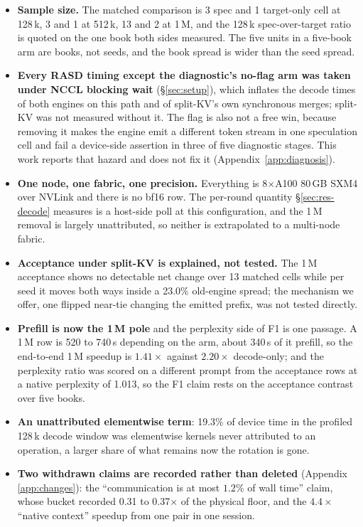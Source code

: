 \documentclass{article}
\begin{document}
\begin{itemize}[leftmargin=*,topsep=2pt,itemsep=1pt]
  \item \textbf{Sample size.} The matched comparison is 3 spec and 1 target-only cell at
        128\,k, 3 and 1 at 512\,k, 13 and 2 at 1\,M, and the 128\,k spec-over-target ratio is
        quoted on the one book both sides measured. The five units in a five-book arm are
        books, not seeds, and the book spread is wider than the seed spread.
  \item \textbf{Every RASD timing except the diagnostic's no-flag arm was taken under NCCL
        blocking wait} (\S\ref{sec:setup}), which
        inflates the decode times of both engines on this path and of split-KV's own
        synchronous merges; split-KV was not measured without it. The flag is also not a free
        win, because removing it makes the engine emit a different token stream in one
        speculation cell and fail a device-side assertion in three of five diagnostic stages.
        This work reports that hazard and does not fix it (Appendix~\ref{app:diagnosis}).
  \item \textbf{One node, one fabric, one precision.} Everything is 8$\times$A100 80\,GB SXM4
        over NVLink and there is no bf16 row. The per-round quantity \S\ref{sec:res-decode}
        measures is a host-side poll at this configuration, and the 1\,M removal is largely
        unattributed, so neither is extrapolated to a multi-node fabric.
  \item \textbf{Acceptance under split-KV is explained, not tested.} The 1\,M acceptance
        shows no detectable net change over 13 matched cells while per seed it moves both ways
        inside a 23.0\% old-engine spread; the mechanism we offer, one flipped near-tie changing the emitted
        prefix, was not tested directly.
  \item \textbf{Prefill is now the 1\,M pole} and the perplexity side of F1 is one passage. A
        1\,M row is 520 to 740\,s depending on the arm, about 340\,s of it prefill, so the
        end-to-end 1\,M speedup is $1.41\times$ against $2.20\times$ decode-only; and the
        perplexity ratio was scored on a different prompt from the acceptance rows at a native
        perplexity of 1.013, so the F1 claim rests on the acceptance contrast over five books.
  \item \textbf{An unattributed elementwise term}: 19.3\% of device time in the profiled
        128\,k decode window was elementwise kernels never attributed to an operation, a larger
        share of what remains now the rotation is gone.
  \item \textbf{Two withdrawn claims are recorded rather than deleted} (Appendix
        \ref{app:changes}): the ``communication is at most $1.2\%$ of wall time'' claim, whose
        bucket recorded 0.31 to 0.37$\times$ of the physical floor, and the $4.4\times$
        ``native context'' speedup from one pair in one session.
\end{itemize}
\end{document}
